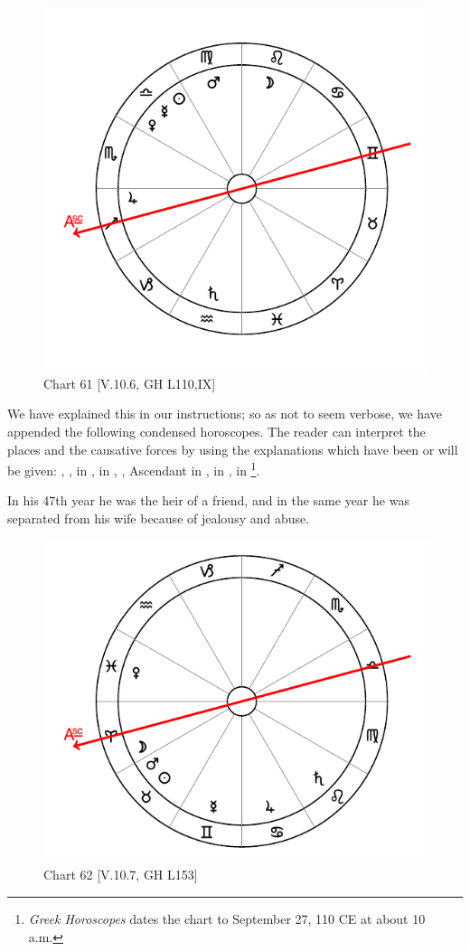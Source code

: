 \begin{figure}
\centering
\vspace{-20pt}
\includegraphics[width=.68\textwidth]{charts/5_10_06}
\caption{Chart 61 [V.10.6, GH L110,IX]}
\label{fig:chart61}
\end{figure}

\noindent We have explained this in our instructions; so as not to seem verbose, we have appended the following condensed horoscopes. The reader can interpret the places and the causative forces by using the
explanations which have been or will be given: \Sun, \Mercury, \Venus \xspace in \Libra, \Saturn\xspace in \Aquarius, \Jupiter, Ascendant in \Sagittarius, \Mars\xspace in \Virgo, \Moon in \Leo\footnote{\textit{Greek Horoscopes} dates the chart to September 27, 110 CE at about 10 a.m.}. 

In his 47th year he was the heir of a friend, and in the same year he was separated from his wife because of jealousy and abuse.

\begin{figure}
\centering
\vspace{-20pt}
\includegraphics[width=.68\textwidth]{charts/5_10_07}
\caption{Chart 62 [V.10.7, GH L153]}
\label{fig:chart62}
\end{figure}

